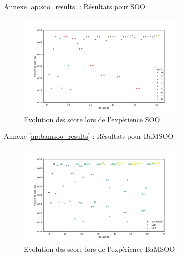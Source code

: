 \begin{frame}{Annexe \ref{ap:soo_results} : Résultats pour SOO}
    \label{ap:soo_results}
    \begin{figure}
        \centering
        \includegraphics[height = 5cm]{assets/imgs/plots/soo/score_evolution.png}
        \caption{Evolution des score lors de l'expérience SOO}
    \end{figure} 
\end{frame}

\begin{frame}{Annexe \ref{ap:bamsoo_results} : Résultats pour BaMSOO}
    \label{ap:bamsoo_results}
    \begin{figure}
        \centering
        \includegraphics[height = 5cm]{assets/imgs/plots/bamsoo/score_evolution.png}
        \caption{Evolution des score lors de l'expérience BaMSOO}
    \end{figure} 
\end{frame}